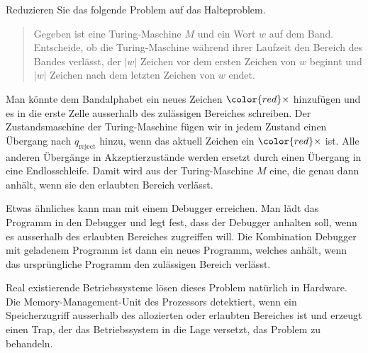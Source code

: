 Reduzieren Sie das folgende Problem auf das Halteproblem.

\begin{quote}
Gegeben ist eine Turing-Maschine $M$ und ein Wort $w$ auf dem Band.
Entscheide, ob die Turing-Maschine während ihrer Laufzeit den 
Bereich des Bandes verlässt, der $|w|$ Zeichen vor dem ersten
Zeichen von $w$ beginnt und $|w|$ Zeichen nach dem letzten Zeichen
von $w$ endet.
\end{quote}

\begin{center}
\end{center}


\begin{loesung}
Man könnte dem Bandalphabet ein neues Zeichen $\color{red}\times$
hinzufügen und es in die erste Zelle ausserhalb des zulässigen 
Bereiches schreiben.
Der Zustandsmaschine der Turing-Maschine fügen wir in jedem Zustand
einen Übergang nach $q_{\text{reject}}$ hinzu, wenn das aktuell Zeichen
ein ${\color{red}\times}$ ist.
Alle anderen Übergänge in Akzeptierzustände werden ersetzt durch einen
Übergang in eine Endlosschleife.
Damit wird aus der Turing-Maschine $M$ eine, die genau dann anhält,
wenn sie den erlaubten Bereich verlässt.

Etwas ähnliches kann man mit einem Debugger erreichen.
Man lädt das Programm in den Debugger und legt fest, dass
der Debugger anhalten soll, wenn es ausserhalb des erlaubten Bereiches
zugreiffen will.
Die Kombination Debugger mit geladenem Programm ist dann ein neues
Programm, welches anhält, wenn das ursprüngliche Programm den zulässigen
Bereich verlässt.

Real existierende Betriebssysteme lösen dieses Problem natürlich in 
Hardware.
Die Memory-Management-Unit des Prozessors detektiert, wenn ein
Speicherzugriff ausserhalb des allozierten oder erlaubten Bereiches ist 
und erzeugt einen Trap, der das Betriebssystem in die Lage versetzt,
das Problem zu behandeln.
\end{loesung}
